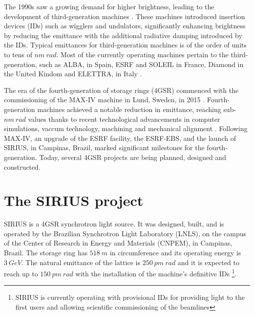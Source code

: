 The 1990s saw a growing demand for higher brightness, leading to the development of third-generation machines \cite{liu_towards_2017}. These machines introduced insertion devices (IDs) such as wigglers and undulators, significantly enhancing brightness by reducing the emittance with the additional radiative damping introduced by the IDs. 
Typical emittances for third-generation machines is of the order of units to tens of $\unit{nm}~\unit{rad}$. Most of the currently operating machines pertain to the third-generation, such as ALBA, in Spain, ESRF and SOLEIL in France, Diamond in the United Kindom and ELETTRA, in Italy \cite{simoulin_synchrotron_2016}.

The era of the fourth-generation of storage rings (4GSR) commenced with the commissioning of the MAX-IV machine in Lund, Sweden, in 2015 \cite{liu_towards_2017,hettel_challenges_2014}. Fourth-generation machines achieved a notable reduction in emittance, reaching sub-$\unit{nm}~\unit{rad}$ values thanks to recent technological advancements in computer simulations, vaccum technology, machining and mechanical alignment \cite{hettel_challenges_2014,liu_towards_2017}. Following MAX-IV, an upgrade of the ESRF facility, the ESRF-EBS, and the launch of SIRIUS, in Campinas, Brazil, marked significant milestones for the fourth-generation. Today, several 4GSR projects are being planned, designed and constructed.

\section{The SIRIUS project}
SIRIUS is a 4GSR synchrotron light source. It was designed, built, and is operated by the Brazilian Synchrotron Light Laboratory (LNLS), on the campus of the Center of Research in Energy and Materials (CNPEM), in Campinas, Brazil. The storage ring has $518~\unit{m}$ in circumference and its operating energy is $3~\unit{GeV}$. The natural emittance of the lattice is $250~\unit{pm}~\unit{rad}$ and it is expected to reach up to $150~\unit{pm}~\unit{rad}$ with the installation of the machine's definitive IDs \cite{liu_synchrotron_2019}\footnote{SIRIUS is currently operating with provisional IDs for providing light to the first users and allowing scientific commissioning of the beamlines}.

